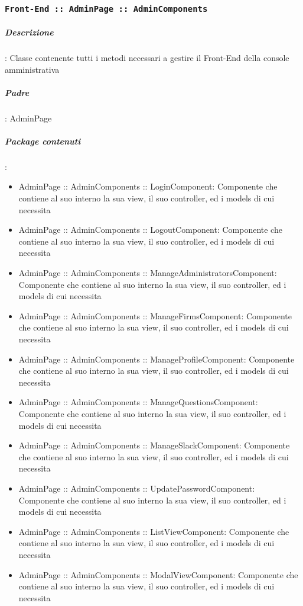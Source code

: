 \documentclass[../DefinizioneDiProdotto_v3.0.0.tex]{subfiles}
\begin{document}
	\subsubsection{\texttt{Front-End :: AdminPage :: AdminComponents}}

		\subparagraph{Descrizione}: Classe contenente tutti i metodi necessari a gestire il Front-End della console amministrativa
		\subparagraph{Padre}: AdminPage
		\subparagraph{Package contenuti}:
		\begin{itemize}
			\item AdminPage :: AdminComponents :: LoginComponent: Componente che contiene al suo interno la sua view, il suo controller, ed i models di cui necessita
			\item AdminPage :: AdminComponents :: LogoutComponent: Componente che contiene al suo interno la sua view, il suo controller, ed i models di cui necessita
			\item AdminPage :: AdminComponents :: ManageAdministratorsComponent: Componente che contiene al suo interno la sua view, il suo controller, ed i models di cui necessita
			\item AdminPage :: AdminComponents :: ManageFirmsComponent: Componente che contiene al suo interno la sua view, il suo controller, ed i models di cui necessita
			\item AdminPage :: AdminComponents :: ManageProfileComponent: Componente che contiene al suo interno la sua view, il suo controller, ed i models di cui necessita
			\item AdminPage :: AdminComponents :: ManageQuestionsComponent: Componente che contiene al suo interno la sua view, il suo controller, ed i models di cui necessita
			\item AdminPage :: AdminComponents :: ManageSlackComponent: Componente che contiene al suo interno la sua view, il suo controller, ed i models di cui necessita
			\item AdminPage :: AdminComponents :: UpdatePasswordComponent: Componente che contiene al suo interno la sua view, il suo controller, ed i models di cui necessita
			\item AdminPage :: AdminComponents :: ListViewComponent: Componente che contiene al suo interno la sua view, il suo controller, ed i models di cui necessita
			\item AdminPage :: AdminComponents :: ModalViewComponent: Componente che contiene al suo interno la sua view, il suo controller, ed i models di cui necessita
		\end{itemize}
\end{document}

